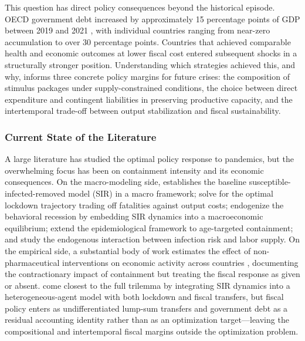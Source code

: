 \documentclass[12pt, a4paper]{article}
\begin{document}
\medskip
\noindent This question has direct policy consequences beyond the historical episode. OECD government debt increased by approximately 15 percentage points of GDP between 2019 and 2021 
\citep{OECD2022borrowing}, with individual countries ranging from near-zero accumulation to over 30 percentage points. Countries that achieved comparable health and economic outcomes at lower 
fiscal cost entered subsequent shocks in a structurally stronger position. Understanding which strategies achieved this, and why, informs three concrete policy margins for future crises: the 
composition of stimulus packages under supply-constrained conditions, the choice between direct expenditure and contingent liabilities in preserving productive capacity, and the 
intertemporal trade-off between output stabilization and fiscal sustainability. %


\subsubsection{Current State of the Literature}
A large literature has studied the optimal policy response to pandemics, but the overwhelming focus has been on containment intensity and its economic consequences. On the macro-modeling side, \citet{Atkeson2020} establishes the baseline susceptible-infected-removed model (SIR) in a macro framework; \citet{alvarez2020} solve for the optimal lockdown trajectory trading off fatalities against output costs; \citet{eichenbaum2021macro} endogenize the behavioral recession by embedding SIR dynamics into a macroeconomic equilibrium; \citet{acemoglu2021} extend the epidemiological framework to age-targeted containment; and \citet{Jones2021} study the endogenous interaction between infection risk and labor supply. On the empirical side, a substantial body of work estimates the effect of non-pharmaceutical interventions on economic activity across countries \citep{Ashraf2022, Konig2020, Cross2020, Gordon2021}, documenting the contractionary impact of containment but treating the fiscal response as given or absent. \citet{KaplanMollViolante2020} come closest to the full trilemma by integrating SIR dynamics into a heterogeneous-agent model with both lockdown and fiscal transfers, but fiscal policy enters as undifferentiated lump-sum transfers and government debt as a residual accounting identity rather than as an optimization target---leaving the compositional and intertemporal fiscal margins outside the optimization problem.
\end{document}
